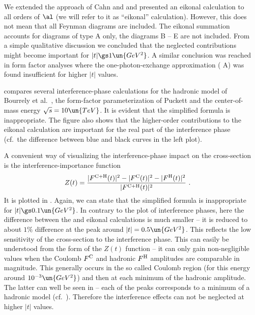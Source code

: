 We extended the approach of Cahn and \KaL{} and presented an eikonal calculation to all orders of $\al$ (we will refer to it as ``eikonal'' calculation). However, this does not mean that all Feynman diagrams are included. The eikonal summation accounts for diagrams of type  A only, the diagrams B -- E are not included. From a simple qualitative discussion we concluded that the neglected contributions might become important for $|t| \gs 1\un{GeV^2}$. A similar conclusion was reached in form factor analyses  where the one-photon-exchange approximation ( A) was found insufficient for higher $|t|$ values.


 compares several interference-phase calculations for the hadronic model of Bourrely et al.~, the form-factor parameterization of Puckett  and the center-of-mass energy $\sqrt s = 10 \un{TeV}$. It is evident that the simplified \WaY{} formula is inappropriate. The figure also shows that the higher-order contributions to the eikonal calculation are important for the real part of the interference phase (cf.~the difference between blue and black curves in the left plot).



A convenient way of visualizing the interference-phase impact on the cross-section is the interference-importance function
$$Z(t) = {|F^{\rm C+H}(t)|^2 - |F^{\rm C}(t)|^2 - |F^{\rm H}(t)|^2\over |F^{\rm C+H}(t)|^2}\ .$$
It is plotted in . Again, we can state that the simplified \WaY{} formula is inappropriate for $|t| \gs 0.1\un{GeV^2}$. In contrary to the plot of interference phases, here the difference between the \KaL{} and eikonal calculations is much smaller -- it is reduced to about $1\%$ difference at the peak around $|t| = 0.5\un{GeV^2}$. This reflects the low sensitivity of the cross-section to the interference phase. This can easily be understood from the form of the $Z(t)$ function -- it can only gain non-negligible values when the Coulomb $F^{\rm C}$ and hadronic $F^{\rm H}$ amplitudes are comparable in magnitude. This generally occurs in the so called Coulomb region (for this energy around $10^{-3}\un{GeV^2}$) and then at each minimum of the hadronic amplitude. The latter can well be seen in  -- each of the peaks corresponds to a minimum of a hadronic model (cf.~). Therefore the interference effects can not be neglected at higher $|t|$ values.

